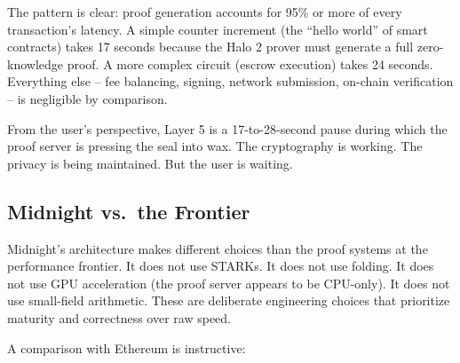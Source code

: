 \documentclass[
  11pt,
  openany]{report}
\begin{document}
The pattern is clear: proof generation accounts for 95\% or more of every
transaction's latency. A simple counter increment (the ``hello world'' of smart
contracts) takes 17 seconds because the Halo 2 prover must generate a full
zero-knowledge proof. A more complex circuit (escrow execution) takes 24
seconds. Everything else -- fee balancing, signing, network submission, on-chain
verification -- is negligible by comparison.

From the user's perspective, Layer 5 is a 17-to-28-second pause during which the
proof server is pressing the seal into wax. The cryptography is working. The
privacy is being maintained. But the user is waiting.

\subsection{Midnight vs.~the Frontier}\label{midnight-vs.-the-frontier}

Midnight's architecture makes different choices than the proof systems at the
performance frontier. It does not use STARKs. It does not use folding. It does
not use GPU acceleration (the proof server appears to be CPU-only). It does not
use small-field arithmetic. These are deliberate engineering choices that
prioritize maturity and correctness over raw speed.

A comparison with Ethereum is instructive:
\end{document}
